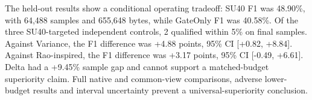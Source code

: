 The held-out results show a conditional operating tradeoff: SU40 F1 was 48.90\%, with 64,488 samples and 655,648 bytes, while GateOnly F1 was 40.58\%. Of the three SU40-targeted independent controls, 2 qualified within 5\% on final samples. Against Variance, the F1 difference was +4.88 points, 95\% CI [+0.82, +8.84]. Against Rao-inspired, the F1 difference was +3.17 points, 95\% CI [-0.49, +6.61]. Delta had a +9.45\% sample gap and cannot support a matched-budget superiority claim. Full native and common-view comparisons, adverse lower-budget results and interval uncertainty prevent a universal-superiority conclusion.
